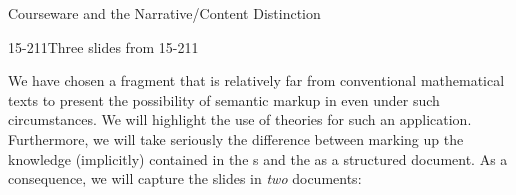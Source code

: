 \begin{tchapter}[id=courseware]{Courseware and the Narrative/Content Distinction}
\begin{myfig}{15-211}{Three slides from 15-211}
  \quad
  \\[1ex]
  \quad
\end{myfig}

We have chosen a fragment that is relatively far from conventional mathematical
texts to present the possibility of semantic markup in {\omdoc} even under such
circumstances.  We will highlight the use of {\omdoc} theories for
such an application. Furthermore, we will take seriously the difference between
marking up the knowledge (implicitly) contained in the {s} and the
{} as a structured
document. As a consequence, we will capture the slides in {\emph{two}} documents:


\end{tchapter}
